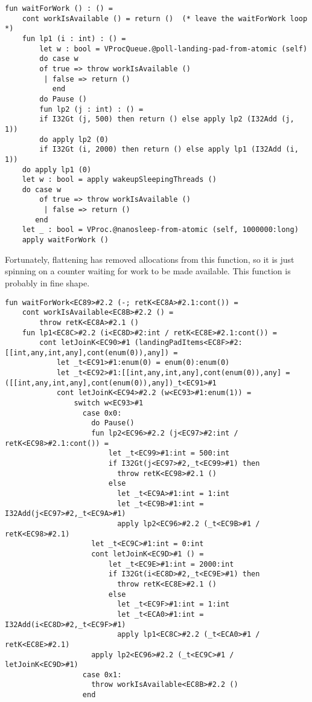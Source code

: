 \documentclass[11pt]{article}
\begin{document}
\begin{lstlisting}
fun waitForWork () : () =
    cont workIsAvailable () = return ()  (* leave the waitForWork loop *)
    fun lp1 (i : int) : () =
        let w : bool = VProcQueue.@poll-landing-pad-from-atomic (self)
        do case w
    	of true => throw workIsAvailable ()
    	 | false => return ()
           end
        do Pause ()
        fun lp2 (j : int) : () = 
    	if I32Gt (j, 500) then return () else apply lp2 (I32Add (j, 1))
        do apply lp2 (0)
        if I32Gt (i, 2000) then return () else apply lp1 (I32Add (i, 1))
    do apply lp1 (0)
    let w : bool = apply wakeupSleepingThreads ()
    do case w
        of true => throw workIsAvailable ()
         | false => return ()
       end
    let _ : bool = VProc.@nanosleep-from-atomic (self, 1000000:long)
    apply waitForWork ()
\end{lstlisting}

Fortunately, flattening has removed allocations from this function, so it is just spinning on a counter waiting for work to be made available.
This function is probably in fine shape.

\begin{lstlisting}
fun waitForWork<EC89>#2.2 (-; retK<EC8A>#2.1:cont()) =
    cont workIsAvailable<EC8B>#2.2 () =
        throw retK<EC8A>#2.1 ()
    fun lp1<EC8C>#2.2 (i<EC8D>#2:int / retK<EC8E>#2.1:cont()) =
        cont letJoinK<EC90>#1 (landingPadItems<EC8F>#2:[[int,any,int,any],cont(enum(0)),any]) =
            let _t<EC91>#1:enum(0) = enum(0):enum(0)
            let _t<EC92>#1:[[int,any,int,any],cont(enum(0)),any] = ([[int,any,int,any],cont(enum(0)),any])_t<EC91>#1
            cont letJoinK<EC94>#2.2 (w<EC93>#1:enum(1)) =
                switch w<EC93>#1
                  case 0x0:
                    do Pause()
                    fun lp2<EC96>#2.2 (j<EC97>#2:int / retK<EC98>#2.1:cont()) =
                        let _t<EC99>#1:int = 500:int
                        if I32Gt(j<EC97>#2,_t<EC99>#1) then
                          throw retK<EC98>#2.1 ()
                        else
                          let _t<EC9A>#1:int = 1:int
                          let _t<EC9B>#1:int = I32Add(j<EC97>#2,_t<EC9A>#1)
                          apply lp2<EC96>#2.2 (_t<EC9B>#1 / retK<EC98>#2.1)
                    let _t<EC9C>#1:int = 0:int
                    cont letJoinK<EC9D>#1 () =
                        let _t<EC9E>#1:int = 2000:int
                        if I32Gt(i<EC8D>#2,_t<EC9E>#1) then
                          throw retK<EC8E>#2.1 ()
                        else
                          let _t<EC9F>#1:int = 1:int
                          let _t<ECA0>#1:int = I32Add(i<EC8D>#2,_t<EC9F>#1)
                          apply lp1<EC8C>#2.2 (_t<ECA0>#1 / retK<EC8E>#2.1)
                    apply lp2<EC96>#2.2 (_t<EC9C>#1 / letJoinK<EC9D>#1)
                  case 0x1:
                    throw workIsAvailable<EC8B>#2.2 ()
                  end
\end{lstlisting}
\end{document}

